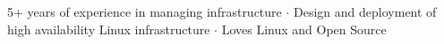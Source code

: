 

\begin{cvparagraph}
5+ years of experience in managing infrastructure ${\cdotp}$ Design and deployment of high availability Linux infrastructure ${\cdotp}$ Loves Linux and Open Source
\end{cvparagraph}
